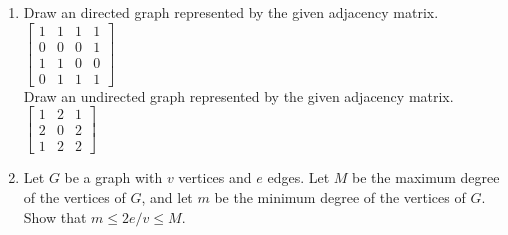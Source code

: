\documentclass[12pt,en,a4paper]{article}
\begin{document}
\begin{enumerate}
\begin{figure}[ht]
\begin{minipage}{0.3\textwidth}
				\label{fig:gprob3_3}
			\end{minipage}
		\end{figure}
		\item Draw an directed graph represented by the given adjacency matrix.
		$\begin{bmatrix}
			1 & 1 & 1 & 1 \\
			0 & 0 & 0 & 1 \\
			1 & 1 & 0 & 0 \\
			0 & 1 & 1 & 1
		\end{bmatrix}$ \\
		Draw an undirected graph represented by the given adjacency matrix.
		$\begin{bmatrix}
		1 & 2 & 1 \\
		2 & 0 & 2 \\
		1 & 2 & 2
		\end{bmatrix}$
		\item Let $G$ be a graph with $v$ vertices and $e$ edges. Let $M$ be the maximum degree of the vertices of $G$, and let $m$ be the minimum degree of the vertices of $G$. Show that $m \leq 2e/v \leq M$.
	\end{enumerate}
	
\end{document}
